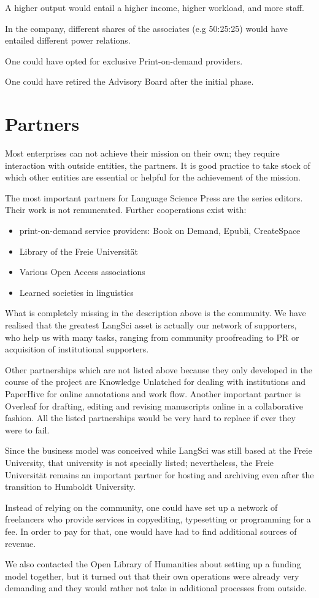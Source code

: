 \documentclass[output=guidelines,nonflat,smallfont,
draftmode
]{langsci/langscibook}
\newcommand{\background}[1]{ 
  \vspace{5mm}
  \renewcommand{\tblslinecolour}{lsDarkBlue}
  \tblssy[red]{explore2}{Background}{\vspace*{-5mm}#1}
}
\newcommand{\langscisolution}[1]{
  \renewcommand{\tblslinecolour}{lsLightBlue}
  \tblssy{langsci}{LangSci solution}{\vspace*{-5mm}#1}
}
\newcommand{\evaluation}[1]{
  \renewcommand{\tblslinecolour}{lsLightOrange}
  \tblssy{receipt}{Evaluation}{\vspace*{-5mm}#1}
}
\newcommand{\othersolutions}[1]{
  \renewcommand{\tblslinecolour}{lsDarkGreenOne}
  \tblssy{more}{Other solutions}{\vspace*{-5mm}#1}
}
\renewcommand{\tblssy}[4][black!12]{%
  \renewcommand{\langscisymbol}{#2}\renewcommand{\tblsboxcolor}{#1}
  \begin{mdframed}[style=yellowexercise,frametitle={#3}]
    #4
  \end{mdframed}
}
\begin{document}
\othersolutions{A higher output would entail a higher income, higher workload, and more staff. 

In the company, different shares of the associates (e.g 50:25:25) would have entailed different power relations.

One could have opted for exclusive Print-on-demand providers. 

One could have retired the Advisory Board after the initial phase. 

}
 
\section{Partners}

\background{Most enterprises can not achieve their mission on their own; they require interaction with outside entities, the partners. It is good practice to take stock of which other entities are essential or helpful for the achievement of the mission.}
\langscisolution{
The most important partners for Language Science Press are the series editors. Their work is not remunerated. Further cooperations exist with:
\begin{itemize}
 \item print-on-demand service providers: Book on Demand, Epubli, CreateSpace 
 \item Library of the Freie Universität 
 \item Various Open Access associations 
 \item Learned societies in linguistics
\end{itemize}
}
\evaluation{
What is completely missing in the description above is the community. We have realised that the greatest LangSci asset is actually our network of supporters, who help us with many tasks, ranging from community proofreading to PR or acquisition of institutional supporters. 

Other partnerships which are not listed above because they only developed in the course of the project are Knowledge Unlatched for dealing with institutions and PaperHive for online annotations and work flow. Another important partner is Overleaf for drafting, editing and revising manuscripts online in a collaborative fashion. All the listed partnerships would be very hard to replace if ever they were to fail.

Since the business model was conceived while LangSci was still based at the Freie University, that university is not specially listed; nevertheless, the Freie Universität remains an important partner for hosting and archiving even after the transition to Humboldt University.
}
\othersolutions{ 
Instead of relying on the community, one could have set up a network of freelancers who provide services in copyediting, typesetting or programming for a fee. In order to pay for that, one would have had to find additional sources of revenue. 

We also contacted the Open Library of Humanities about setting up a funding model together, but it turned out that their own operations were already very demanding and they would rather not take in additional processes from outside. 
}
 
\end{document}
